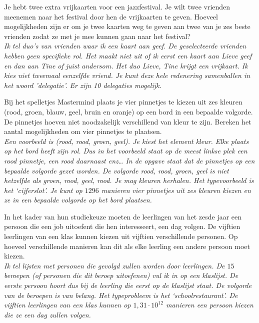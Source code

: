 \begin{werktekstoef}

\item{Je hebt twee extra vrijkaarten voor een jazzfestival. Je wilt twee vrienden meenemen naar het festival door hen de vrijkaarten te geven. Hoeveel mogelijkheden zijn er om je twee kaarten weg te geven aan twee van je zes beste vrienden zodat ze met je mee kunnen gaan naar het festival?}\\

\emph{Ik tel duo’s van vrienden waar ik een kaart aan geef. De geselecteerde vrienden hebben geen specifieke rol. Het maakt niet uit of ik eerst een kaart aan Lieve geef en dan aan Tine of juist andersom. Het duo Lieve, Tine krijgt een vrijkaart. Ik kies niet tweemaal eenzelfde vriend. Je kunt deze hele redenering samenballen in het woord 'delegatie'. Er zijn 10 delegaties mogelijk.}

\item {Bij het spelletjes Mastermind plaats je vier pinnetjes te kiezen uit zes kleuren (rood, groen, blauw, geel, bruin en oranje) op een bord in een bepaalde volgorde. De pinnetjes hoeven niet noodzakelijk verschillend van kleur te zijn.  Bereken het aantal mogelijkheden om vier pinnetjes te plaatsen.}\\
\emph{Een voorbeeld is (rood, rood, groen, geel). Je kiest het element kleur. Elke plaats op het bord heeft zijn rol. Dus in het voorbeeld staat op de meest linkse plek een rood pinnetje, een rood daarnaast enz… In de opgave staat dat de pinnetjes op een bepaalde volgorde gezet worden. De volgorde rood, rood, groen, geel is niet hetzelfde als groen, rood, geel, rood. Je mag kleuren herhalen. Het typevoorbeeld is het `cijferslot'. Je kunt op $1296$ manieren vier pinnetjes uit zes kleuren kiezen en ze in een bepaalde volgorde op het bord plaatsen.}

\item {In het kader van hun studiekeuze moeten de leerlingen van het zesde jaar een persoon die een job uitoefent die hen interesseert, een dag volgen. De vijftien leerlingen van een klas kunnen kiezen uit vijftien verschillende personen. Op hoeveel verschillende manieren kan dit als elke leerling een andere persoon moet kiezen.}\\
\emph{Ik tel lijsten met personen die gevolgd zullen worden door leerlingen. De $15$ beroepen (of personen die dit beroep uitoefenen) vul ik in op een klaslijst. De eerste persoon hoort dus bij de leerling die eerst op de klaslijst staat. De volgorde van de beroepen is van belang. Het typeprobleem is het `schoolrestaurant'. De vijftien leerlingen van een klas kunnen op $1,31 \cdot 10^{12}$ manieren een persoon kiezen die ze een dag zullen volgen.}


\end{werktekstoef}

